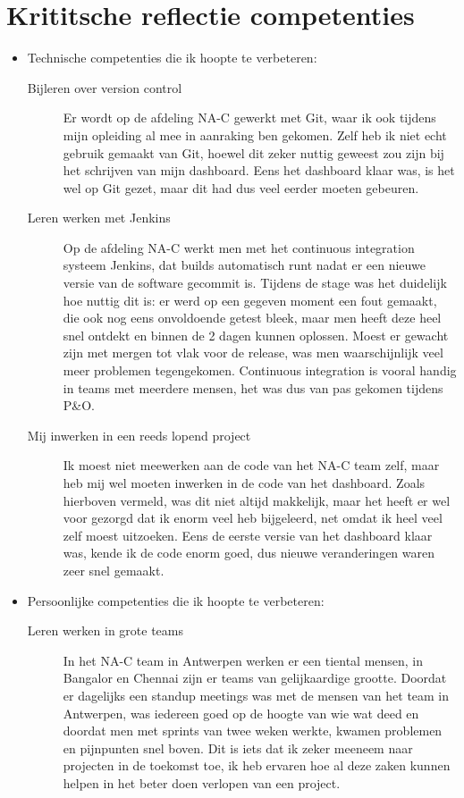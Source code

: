 \documentclass[10pt,a4paper]{article}
\begin{document}
\section{Krititsche reflectie competenties}
\begin{itemize}
\item Technische competenties die ik hoopte te verbeteren:
\begin{description}
\item[Bijleren over version control] Er wordt op de afdeling NA-C gewerkt met Git, waar ik ook tijdens mijn opleiding al mee in aanraking ben gekomen. Zelf heb ik niet echt gebruik gemaakt van Git, hoewel dit zeker nuttig geweest zou zijn bij het schrijven van mijn dashboard. Eens het dashboard klaar was, is het wel op Git gezet, maar dit had dus veel eerder moeten gebeuren.
\item[Leren werken met Jenkins] Op de afdeling NA-C werkt men met het continuous integration systeem Jenkins, dat builds automatisch runt nadat er een nieuwe versie van de software gecommit is. Tijdens de stage was het duidelijk hoe nuttig dit is: er werd op een gegeven moment een fout gemaakt, die ook nog eens onvoldoende getest bleek, maar men heeft deze heel snel ontdekt en binnen de 2 dagen kunnen oplossen. Moest er gewacht zijn met mergen tot vlak voor de release, was men waarschijnlijk veel meer problemen tegengekomen. Continuous integration is vooral handig in teams met meerdere mensen, het was dus van pas gekomen tijdens P\&O. 
\item[Mij inwerken in een reeds lopend project] Ik moest niet meewerken aan de code van het NA-C team zelf, maar heb mij wel moeten inwerken in de code van het dashboard. Zoals hierboven vermeld, was dit niet altijd makkelijk, maar het heeft er wel voor gezorgd dat ik enorm veel heb bijgeleerd, net omdat ik heel veel zelf moest uitzoeken. Eens de eerste versie van het dashboard klaar was, kende ik de code enorm goed, dus nieuwe veranderingen waren zeer snel gemaakt.
\end{description}
\item Persoonlijke competenties die ik hoopte te verbeteren:
\begin{description}
\item[Leren werken in grote teams] In het NA-C team in Antwerpen werken er een tiental mensen, in Bangalor en Chennai zijn er teams van gelijkaardige grootte. Doordat er dagelijks een standup meetings was met de mensen van het team in Antwerpen, was iedereen goed op de hoogte van wie wat deed en doordat men met sprints van twee weken werkte, kwamen problemen en pijnpunten snel boven. Dit is iets dat ik zeker meeneem naar projecten in de toekomst toe, ik heb ervaren hoe al deze zaken kunnen helpen in het beter doen verlopen van een project.

\end{description}
\end{itemize}
\end{document}
